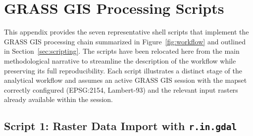 \documentclass[coasts,article,accept,pdftex,moreauthors]{Definitions/mdpi}
\begin{document}






\appendix

\makeatletter
{}
\renewcommand{\thelstlisting}{A\arabic{lstlisting}}
\makeatother
\section[\appendixname~\thesection]{GRASS GIS Processing Scripts}
\label{app:scripts}


{This appendix provides the seven representative shell scripts that implement the GRASS GIS processing chain summarized in Figure~\ref{fig:workflow} and outlined in Section~\ref{sec:scripting}. The scripts have been relocated here from the main methodological narrative to streamline the description of the workflow while preserving its full reproducibility. Each script illustrates a distinct stage of the analytical workflow and assumes an active GRASS GIS session with the mapset correctly configured (EPSG:2154, Lambert-93) and the relevant input rasters already available within the session.}

\subsection{Script 1: %
 Raster Data Import with \texttt{r.in.gdal}}
\end{document}
